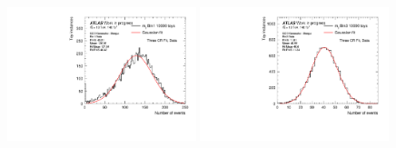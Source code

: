 \begin{figure}[t]
  \centering
  \includegraphics[width=0.49\textwidth]{plots/diffx/statunc/data/Gaussians/sys_bin_errors_mjj_gaus_bin1_Data_Statistics.pdf}
  \includegraphics[width=0.49\textwidth]{plots/diffx/statunc/data/Gaussians/sys_bin_errors_mjj_gaus_bin3_Data_Statistics.pdf}

\end{figure}
